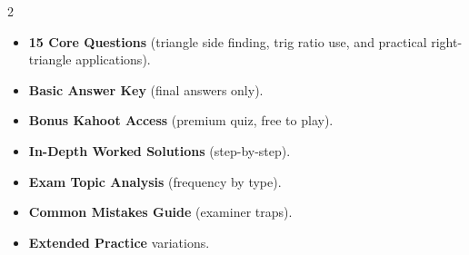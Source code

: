 \documentclass[11pt,a4paper]{article}
\newcommand{\FullReleaseDate}{April 30, 2026}
\begin{document}
\vspace{8pt}

\begin{multicols}{2}
  \begin{tcolorbox}[card, title=\sffamily\bfseries\textcolor{white}{\faHandPointDown\ TODAY (Simplified Version)}, colbacktitle=mainblue, boxed title style={sharp corners, boxrule=0pt}]
    \begin{itemize}[leftmargin=1.2em, itemsep=2pt]
      \item \small \textbf{15 Core Questions} (triangle side finding, trig ratio use, and practical right-triangle applications).
      \item \small \textbf{Basic Answer Key} (final answers only).
      \item \small \textbf{Bonus Kahoot Access} (premium quiz, free to play).
    \end{itemize}
  \end{tcolorbox}

  \columnbreak

  \begin{tcolorbox}[card, title=\sffamily\bfseries\textcolor{white}{\faRocket\ ON \FullReleaseDate\ (Full Upgrade)}, colbacktitle=mainblue, boxed title style={sharp corners, boxrule=0pt}]
    \begin{itemize}[leftmargin=1.2em, itemsep=2pt]
      \item \small \textbf{In-Depth Worked Solutions} (step-by-step).
      \item \small \textbf{Exam Topic Analysis} (frequency by type).
      \item \small \textbf{Common Mistakes Guide} (examiner traps).
      \item \small \textbf{Extended Practice} variations.
    \end{itemize}
  \end{tcolorbox}
\end{multicols}
\end{document}
